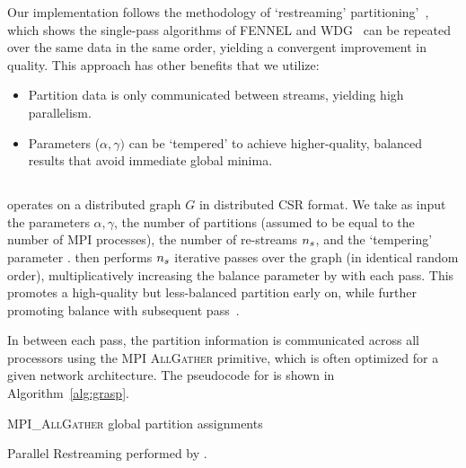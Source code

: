 Our implementation follows the methodology of `restreaming' partitioning'~\cite{nishimura2013restream}, which shows the single-pass algorithms of FENNEL and WDG~\cite{tsourakakis2012fennel,Stanton:2012:SGP:2339530.2339722} can be repeated over the same data in the same order, yielding a convergent improvement in quality. This approach has other benefits that we utilize:

\begin{itemize}
\item Partition data is only communicated between streams, yielding high parallelism.
\item Parameters ($\alpha, \gamma)$ can be `tempered' to achieve higher-quality, balanced results that avoid immediate global minima.
\end{itemize}

\subsection{\ourmethod}
\ourmethod operates on a distributed graph $G$ in distributed CSR format. We take as input the parameters $\alpha, \gamma$, the number of partitions \numprocsparm (assumed to be equal to the number of MPI processes), the number of re-streams $n_s$, and the `tempering' parameter \expparm. \ourmethod then performs $n_s$ iterative passes over the graph (in identical random order), multiplicatively increasing the balance parameter by \expparm with each pass. This promotes a high-quality but less-balanced partition early on, while further promoting balance with subsequent pass~\cite{nishimura2013restream}. 

In between each pass, the partition information is communicated across all processors using the MPI \textsc{AllGather} primitive, which is often optimized for a given network architecture. The pseudocode for \ourmethod is shown in Algorithm~\ref{alg:grasp}.


\begin{algorithm}
 {
	\textsc{MPI\_AllGather} global partition assignments\;
}
 \caption{Parallel Restreaming performed by \ourmethod.}
 \label{alg:grasp}
\end{algorithm}

